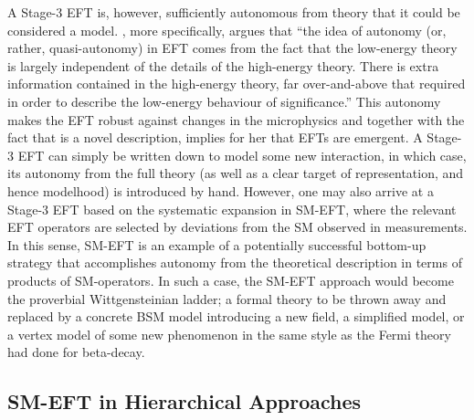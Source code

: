A Stage-3 EFT is, however, sufficiently autonomous from theory that it could be considered a model. 
\citet{Crowther2016-CROESU}, more specifically, argues 
that ``the idea of autonomy (or, rather, quasi-autonomy) in EFT comes from the fact that the low-energy theory is largely independent of the details of the high-energy theory. There is extra information contained in the high-energy theory, far over-and-above that required in order to describe the low-energy behaviour of significance.'' 
This autonomy makes the EFT robust against changes in the microphysics and together with the fact that is a novel description, implies for her that EFTs are emergent.  
A Stage-3 EFT can simply be written down to model some new interaction, in which case, its autonomy from the full theory (as well as a clear target of representation, and hence modelhood) is introduced by hand. 
However, one may also arrive at a Stage-3 EFT based on the systematic expansion in SM-EFT, where the relevant EFT operators are selected by deviations from the SM observed in measurements. 
In this sense, SM-EFT is an example of a potentially successful bottom-up strategy that accomplishes autonomy from the theoretical description in terms of products of SM-operators. 
In such a case, the SM-EFT approach would become the proverbial Wittgensteinian ladder; a formal theory to be thrown away and replaced by a concrete BSM model introducing a new field, a simplified model, or a vertex model of some new phenomenon in the same style as the Fermi theory had done for beta-decay.


\subsection{SM-EFT in Hierarchical Approaches}
\label{sub:modelhood}

